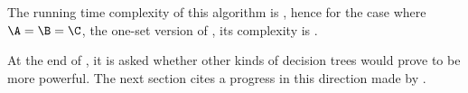 The running time complexity of this algorithm is
\BigO{\card{\C}(\card{\A}+\card{\B})}, hence for the case where
$\A = \B = \C$, \ie the one-set version of \threeSUM, its complexity is
.

At the end of \cite{erickson:1999}, it is asked whether other kinds of
decision trees would prove to be more powerful. The next section cites a
progress in this direction made by \citet*{ailon:2005}.
